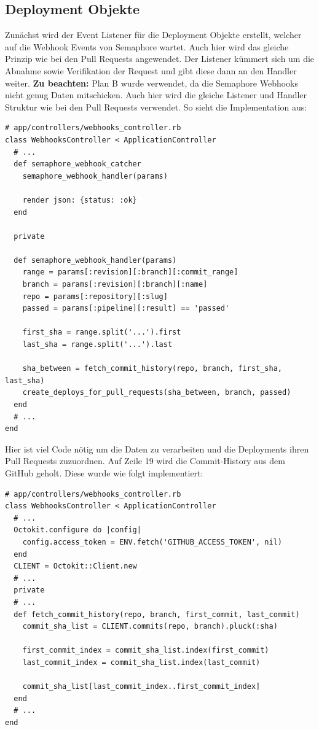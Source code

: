 \subsection{Deployment Objekte}
Zunächst wird der Event Listener für die Deployment Objekte erstellt, welcher auf die Webhook Events von Semaphore
wartet. Auch hier wird das gleiche Prinzip wie bei den Pull Requests angewendet. Der Listener kümmert sich um die
Abnahme sowie Verifikation der Request und gibt diese dann an den Handler weiter. \newline
\textbf{Zu beachten:} Plan B wurde verwendet, da die Semaphore Webhooks nicht genug Daten mitschicken. \newline
Auch hier wird die gleiche Listener und Handler Struktur wie bei den Pull Requests verwendet. So sieht die
Implementation aus:
\begin{codebox}[]
  \begin{verbatim}
# app/controllers/webhooks_controller.rb
class WebhooksController < ApplicationController
  # ...
  def semaphore_webhook_catcher
    semaphore_webhook_handler(params)

    render json: {status: :ok}
  end

  private

  def semaphore_webhook_handler(params)
    range = params[:revision][:branch][:commit_range]
    branch = params[:revision][:branch][:name]
    repo = params[:repository][:slug]
    passed = params[:pipeline][:result] == 'passed'

    first_sha = range.split('...').first
    last_sha = range.split('...').last

    sha_between = fetch_commit_history(repo, branch, first_sha, last_sha)
    create_deploys_for_pull_requests(sha_between, branch, passed)
  end
  # ...
end
  \end{verbatim}
\end{codebox}
Hier ist viel Code nötig um die Daten zu verarbeiten und die Deployments ihren Pull Requests zuzuordnen. Auf Zeile 19
wird die Commit-History aus dem GitHub geholt. Diese wurde wie folgt implementiert:
\begin{codebox}[]
  \begin{verbatim}
# app/controllers/webhooks_controller.rb
class WebhooksController < ApplicationController
  # ...
  Octokit.configure do |config|
    config.access_token = ENV.fetch('GITHUB_ACCESS_TOKEN', nil)
  end
  CLIENT = Octokit::Client.new
  # ...
  private
  # ...
  def fetch_commit_history(repo, branch, first_commit, last_commit)
    commit_sha_list = CLIENT.commits(repo, branch).pluck(:sha)

    first_commit_index = commit_sha_list.index(first_commit)
    last_commit_index = commit_sha_list.index(last_commit)

    commit_sha_list[last_commit_index..first_commit_index]
  end
  # ...
end
  \end{verbatim}
\end{codebox}
